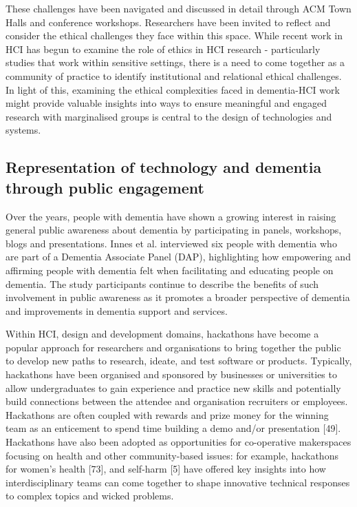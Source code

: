 These challenges have been navigated and discussed in detail through ACM Town Halls and conference workshops. Researchers have been invited to reflect and consider the ethical challenges they face within this space. While recent work in HCI has begun to examine the role of ethics in HCI research - particularly studies that work within sensitive settings, there is a need to come together as a community of practice to identify institutional and relational ethical challenges. In light of this, examining the ethical complexities faced in dementia-HCI work might provide valuable insights into ways to ensure meaningful and engaged research with marginalised groups is central to the design of technologies and systems.


\subsection{Representation of technology and dementia through public engagement}
\label{BL:gap:engagement}
Over the years, people with dementia have shown a growing interest in raising general public awareness about dementia by participating in panels, workshops, blogs and presentations. Innes et al. interviewed six people with dementia who are part of a Dementia Associate Panel (DAP), highlighting how empowering and affirming people with dementia felt when facilitating and educating people on dementia. The study participants continue to describe the benefits of such involvement in public awareness as it promotes a broader perspective of dementia and improvements in dementia support and services.

Within HCI, design and development domains, hackathons have become a popular approach for researchers and organisations to bring together the public to develop new paths to research, ideate, and test software or products. Typically, hackathons have been organised and sponsored by businesses or universities to allow undergraduates to gain experience and practice new skills and potentially build connections between the attendee and organisation recruiters or employees. Hackathons are often coupled with rewards and prize money for the winning team as an enticement to spend time building a demo and/or presentation [49]. Hackathons have also been adopted as opportunities for co-operative makerspaces focusing on health and other community-based issues: for example, hackathons for women’s health [73], and self-harm [5] have offered key insights into how interdisciplinary teams can come together to shape innovative technical responses to complex topics and wicked problems. 

